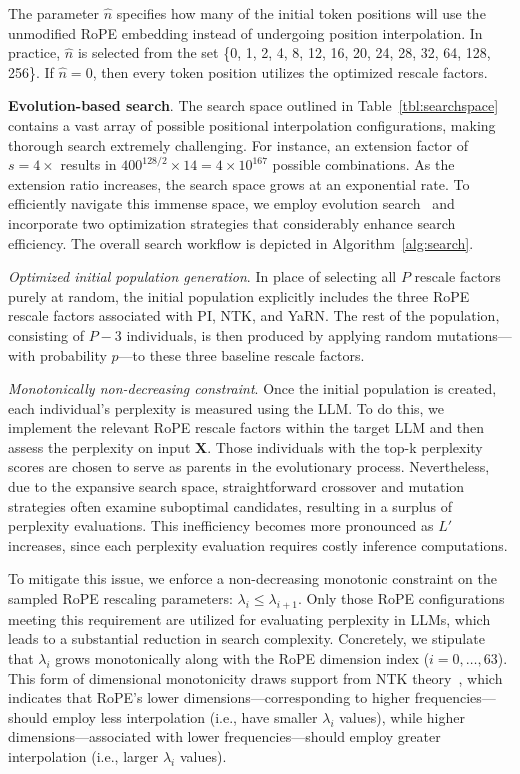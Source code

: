 The parameter $\hat{n}$ specifies how many of the initial token positions will use the unmodified RoPE embedding instead of undergoing position interpolation. In practice, $\hat{n}$ is selected from the set \{0, 1, 2, 4, 8, 12, 16, 20, 24, 28, 32, 64, 128, 256\}. If $\hat{n}=0$, then every token position utilizes the optimized rescale factors.

\textbf{Evolution-based search}. The search space outlined in Table~\ref{tbl:searchspace} contains a vast array of possible positional interpolation configurations, making thorough search extremely challenging. For instance, an extension factor of $s=4\times$ results in $400^{128/2}\times14=4\times10^{167}$ possible combinations. As the extension ratio increases, the search space grows at an exponential rate. To efficiently navigate this immense space, we employ evolution search~\cite{guo2020single} and incorporate two optimization strategies that considerably enhance search efficiency. The overall search workflow is depicted in Algorithm~\ref{alg:search}.

\textit{Optimized initial population generation}. In place of selecting all $P$ rescale factors purely at random, the initial population explicitly includes the three RoPE rescale factors associated with PI, NTK, and YaRN. The rest of the population, consisting of $P-3$ individuals, is then produced by applying random mutations—with probability $p$—to these three baseline rescale factors.

\textit{Monotonically non-decreasing constraint}. Once the initial population is created, each individual's perplexity is measured using the LLM. To do this, we implement the relevant RoPE rescale factors within the target LLM and then assess the perplexity on input $\mathbf{X}$. Those individuals with the top-k perplexity scores are chosen to serve as parents in the evolutionary process. Nevertheless, due to the expansive search space, straightforward crossover and mutation strategies often examine suboptimal candidates, resulting in a surplus of perplexity evaluations. This inefficiency becomes more pronounced as $L'$ increases, since each perplexity evaluation requires costly inference computations.

To mitigate this issue, we enforce a non-decreasing monotonic constraint on the sampled RoPE rescaling parameters: $\lambda_i\le \lambda_{i+1}$. Only those RoPE configurations meeting this requirement are utilized for evaluating perplexity in LLMs, which leads to a substantial reduction in search complexity. Concretely, we stipulate that $\lambda_i$ grows monotonically along with the RoPE dimension index ($i=0,\dots,63$). This form of dimensional monotonicity draws support from NTK theory~\cite{jacot2018neural,tancik2020fourier,ntk}, which indicates that RoPE’s lower dimensions—corresponding to higher frequencies—should employ less interpolation (i.e., have smaller $\lambda_i$ values), while higher dimensions—associated with lower frequencies—should employ greater interpolation (i.e., larger $\lambda_i$ values).

